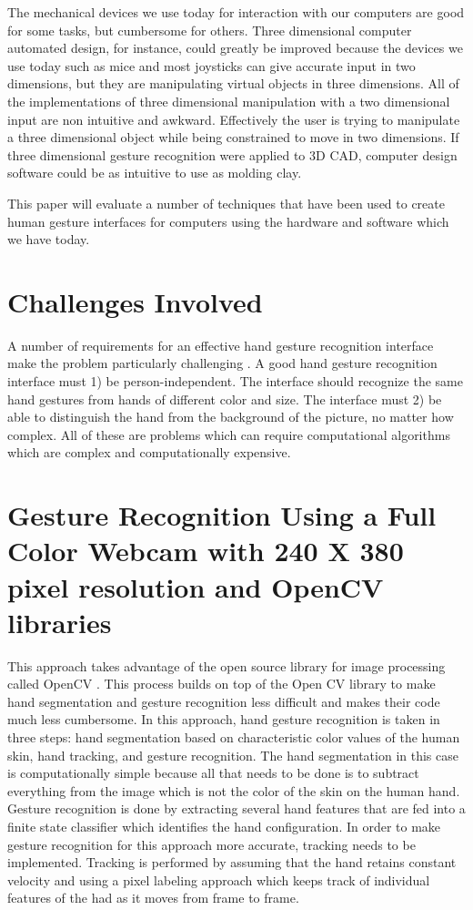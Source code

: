 \documentclass[a4paper,12pt]{report}
\begin{document}
The mechanical devices we use today for interaction with our computers are good for some tasks, but cumbersome for others. Three dimensional computer automated design, for instance, could greatly be improved because the devices we use today such as mice and most joysticks can give accurate input in two dimensions, but they are manipulating virtual objects in three dimensions. All of the implementations of three dimensional manipulation with a two dimensional input are non intuitive and awkward. Effectively the user is trying to manipulate a three dimensional object while being constrained to move in two dimensions. If three dimensional gesture recognition were applied to 3D CAD, computer design software could be as intuitive to use as molding clay. 

This paper will evaluate a number of techniques that have been used to create human gesture interfaces for computers using the hardware and software which we have today. 

\section{Challenges Involved}

A number of requirements for an effective hand gesture recognition interface make the problem particularly challenging \cite{egm}. A good hand gesture recognition interface must 1) be person-independent. The interface should recognize the same hand gestures from hands of different color and size. The interface must 2) be able to distinguish the hand from the background of the picture, no matter how complex. All of these are problems which can require computational algorithms which are complex and computationally expensive. 

\section{Gesture Recognition Using a Full Color Webcam with 240 X 380 pixel resolution and OpenCV libraries}

This approach takes advantage of the open source library for image processing called OpenCV \cite{opencv}. This process builds on top of the Open CV library to make hand segmentation and gesture recognition less difficult and makes their code much less cumbersome. In this approach, hand gesture recognition is taken in three steps: hand segmentation based on characteristic color values of the human skin, hand tracking, and gesture recognition. The hand segmentation in this case is computationally simple because all that needs to be done is to subtract everything from the image which is not the color of the skin on the human hand. Gesture recognition is done by extracting several hand features that are fed into a finite state classifier which identifies the hand configuration.  In order to make gesture recognition for this approach more accurate, tracking needs to be implemented. Tracking is performed by assuming that the hand retains constant velocity and using a pixel labeling approach which keeps track of individual features of the had as it moves from frame to frame. 
\end{document}
